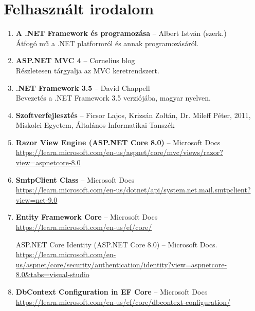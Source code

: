 \section{Felhasznált irodalom}

\begin{enumerate}
    \item \label{ref:albert_dotnet} \textbf{A .NET Framework és programozása} – Albert István (szerk.)\\
    Átfogó mű a .NET platformról és annak programozásáról.

    \item \label{ref:cornelius_mvc} \textbf{ASP.NET MVC 4} – Cornelius blog\\
    Részletesen tárgyalja az MVC keretrendszert. 

    \item \label{ref:chappell_dotnet} \textbf{.NET Framework 3.5} – David Chappell\\
    Bevezetés a .NET Framework 3.5 verziójába, magyar nyelven.

    \item \label{ref:ficsor_szoftver} \textbf{Szoftverfejlesztés} – Ficsor Lajos, Krizsán Zoltán, Dr. Mileff Péter, 2011, Miskolci Egyetem, Általános Informatikai Tanszék

    \item \label{ref:razor_docs} \textbf{Razor View Engine (ASP.NET Core 8.0)} – Microsoft Docs\\
    \url{https://learn.microsoft.com/en-us/aspnet/core/mvc/views/razor?view=aspnetcore-8.0}

    \item \label{ref:smtp_client} \textbf{SmtpClient Class} – Microsoft Docs\\
    \url{https://learn.microsoft.com/en-us/dotnet/api/system.net.mail.smtpclient?view=net-9.0}

    \item \label{ref:ef_core} \textbf{Entity Framework Core} – Microsoft Docs\\
    \url{https://learn.microsoft.com/en-us/ef/core/}

    ASP.NET Core Identity (ASP.NET Core 8.0) – Microsoft Docs.\\
    \url{https://learn.microsoft.com/en-us/aspnet/core/security/authentication/identity?view=aspnetcore-8.0&tabs=visual-studio}


    \item \label{ref:ef_dbcontext} \textbf{DbContext Configuration in EF Core} – Microsoft Docs\\
    \url{https://learn.microsoft.com/en-us/ef/core/dbcontext-configuration/}


\end{enumerate}
